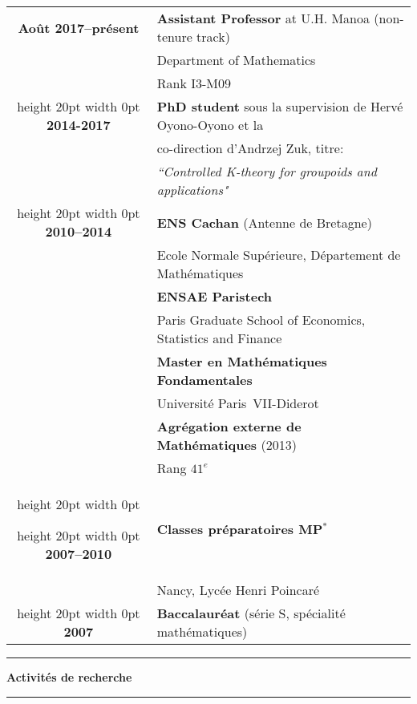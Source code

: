 \documentclass[a4paper,11pt]{article}
\newcommand\espace{\vrule height 20pt width 0pt}
\newcommand{\titre}[1]{%
	\begin{center}
	\bigskip
	\rule{\textwidth}{1pt}
	\par\vspace{0.1cm}
        \textbf{\large #1}
	\par\rule{\textwidth}{1pt}
	\end{center}
	\bigskip
	}
\begin{document}
\begin{tabular}{cp{}}

\textbf{Ao\^{u}t 2017--pr\'{e}sent} &  \textbf{Assistant Professor} at U.H. Manoa (non-tenure track)  \\
						& Department of Mathematics\\
						&  Rank I3-M09 \\
						\espace
\textbf{2014-2017} &  \textbf{PhD student} sous la supervision de Hervé Oyono-Oyono et la  \\
						& co-direction d'Andrzej Zuk, titre: \\	
						& \textit{``Controlled K-theory for groupoids and applications"} \\
\espace
\textbf{2010--2014} &  \textbf{ENS Cachan} (Antenne de Bretagne) \\
				    & 	Ecole Normale Supérieure, D\'epartement de Math\'ematiques \\
                              & \textbf{ENSAE Paristech}\\
				&	Paris Graduate School of Economics, Statistics and Finance\\
                                   & \textbf{Master en Math\'ematiques Fondamentales}\\  & Universit\'e Paris~VII-Diderot \\
                                   & \textbf{Agrégation externe de Mathématiques} (2013) \\ 
							& Rang $41^e$ \\
\espace

\espace
\textbf{2007--2010} &\textbf{Classes préparatoires MP$^*$ } \\
					& Nancy, Lycée Henri Poincaré\\

\espace
\textbf{2007} & \textbf{Baccalauréat} (série S, sp\'ecialit\'e math\'ematiques) 
 \\

\end{tabular}

\newpage
\titre{Activit\'es de recherche}
\end{document}

